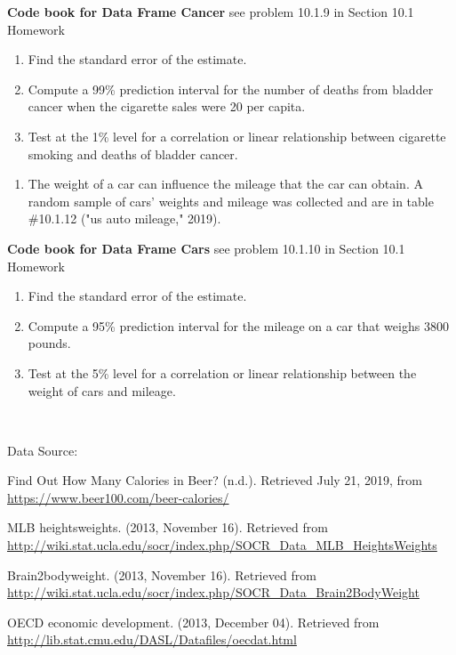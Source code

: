\documentclass[
]{book}
\providecommand{\tightlist}{%
  \setlength{\itemsep}{0pt}\setlength{\parskip}{0pt}}
\begin{document}
\textbf{Code book for Data Frame Cancer} see problem 10.1.9 in Section 10.1 Homework

\begin{enumerate}
\def\labelenumi{\alph{enumi}.}
\tightlist
\item
  Find the standard error of the estimate.
\item
  Compute a 99\% prediction interval for the number of deaths from bladder cancer when the cigarette sales were 20 per capita.
\item
  Test at the 1\% level for a correlation or linear relationship between cigarette smoking and deaths of bladder cancer.
\end{enumerate}

\begin{enumerate}
\def\labelenumi{\arabic{enumi}.}
\setcounter{enumi}{9}
\tightlist
\item
  The weight of a car can influence the mileage that the car can obtain. A random sample of cars' weights and mileage was collected and are in table \#10.1.12 ("us auto mileage," 2019).
\end{enumerate}

\textbf{Code book for Data Frame Cars} see problem 10.1.10 in Section 10.1 Homework

\begin{enumerate}
\def\labelenumi{\alph{enumi}.}
\tightlist
\item
  Find the standard error of the estimate.
\item
  Compute a 95\% prediction interval for the mileage on a car that weighs 3800 pounds.
\item
  Test at the 5\% level for a correlation or linear relationship between the weight of cars and mileage.
\end{enumerate}

\textbf{\\
}

Data Source:

Find Out How Many Calories in Beer? (n.d.). Retrieved July 21, 2019, from \url{https://www.beer100.com/beer-calories/}

MLB heightsweights. (2013, November 16). Retrieved from
\url{http://wiki.stat.ucla.edu/socr/index.php/SOCR_Data_MLB_HeightsWeights}

Brain2bodyweight. (2013, November 16). Retrieved from
\url{http://wiki.stat.ucla.edu/socr/index.php/SOCR_Data_Brain2BodyWeight}

OECD economic development. (2013, December 04). Retrieved from
\url{http://lib.stat.cmu.edu/DASL/Datafiles/oecdat.html}
\end{document}
